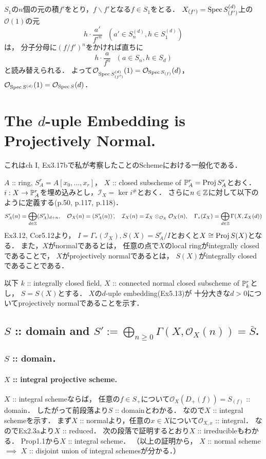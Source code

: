 \documentclass[a4paper]{jsarticle}
\newcommand{\shI}{\mathcal{I}}
\newcommand{\shO}{\mathcal{O}}
\newcommand{\Proj}{\operatorname{Proj}}
\newcommand{\sidetilde}{\,\tilde{}}
\begin{document}
    $S_1$の$n$個の元の積$f'$をとり，$f \backslash f'$となる$f \in S_1$をとる．
    $X_{(f')}=\operatorname{Spec} S_{(f')}^{(d)}$上の$\shO(1)$の元
    \[ h \cdot \frac{a'}{f'^n} ~~~(a' \in S_n^{(d)}, h \in S_1^{(d)}) \]は，
    分子分母に$(f/f')^n$をかければ直ちに
    \[ h \cdot \frac{a}{f^{n}} ~~~ (a \in S_{n}, h \in S_d) \]と読み替えられる．
    よって$\shO_{\Spec S_{(f')}^{(d)}}(1)=\shO_{\Spec S_{(f)}}(d)$，
    $\shO_{\Spec S^{(d)}}(1)=\shO_{\Spec S}(d)$．

\section{The $d$-uple Embedding is Projectively Normal.} %
    これはch I, Ex3.17bで私が考察したことのSchemeにおける一般化である．

    $A$ :: ring, $S_A^r=A[x_0,\dots,x_r]$，
    $X$ :: closed subscheme of $\proj^r_A=\Proj S_A^r$とおく．
    $i: X \to \mathbb{P}^r_A$を埋め込みとし，$\shI_X=\ker i^{\#}$とおく．
    さらに$n \in \mathbb{Z}$に対して以下のように定義する(p.50, p.117, p.118)．
    \[
        S_A^r(n)=\bigoplus_{d \in \Z} (S_A^r)_{d+n},~~~
        \shO_X(n)=(S_A^r(n))\sidetilde,~~~
        \shI_X(n)=\shI_X \otimes_{\shO_X} \shO_X(n),~~~
        \Gamma_*(\shI_X)=\bigoplus_{d \in \Z} \Gamma(X,\shI_X(d))
    \]
    Ex3.12, Cor5.12より，
    $I=\Gamma_*(\shI_X), S(X)=S_A^r/I$とおくと$X \iso \Proj S(X)$となる．
    また，$X$がnormalであるとは，
    任意の点で$X$のlocal ringがintegrally closedであることで，
    $X$がprojectively normalであるとは，
    $S(X)$がintegrally closedであることである．

    以下
    $k$ :: integrally closed field,
    $X$ :: connected normal closed subscheme of $\mathbb{P}_k^r$とし，
    $S=S(X)$とする．
    $X$の$d$-uple embedding(Ex5.13)が
    十分大きな$d>0$についてprojectively normalであることを示す．

    \subsection{$S$ :: domain and $S':=\bigoplus_{n \geq 0} \Gamma(X,\shO_X(n))=\bar{S}$.}
    \subsubsection{$S$ :: domain．}
    \paragraph{$X$ :: integral projective scheme.}
    $X$ :: integral schemeならば，
    任意の$f \in S_+$について$\shO_X(D_+(f))=S_{(f)}$ :: domain．
    したがって前段落より$S$ :: domainとわかる．
    なので$X$ :: integral schemeを示す．
    まず$X$ :: normalより，任意の$x \in X$について$\shO_{X,x}$ :: integral．
    なのでEx2.3aより$X$ :: reduced．
    次の段落で証明するとおり$X$ :: irreducibleもわかる．
    Prop1.1から$X$ :: integral scheme．
    （以上の証明から，
    $X$ :: normal scheme $\implies$ $X$ :: disjoint union of integral schemesが分かる．）
\end{document}
